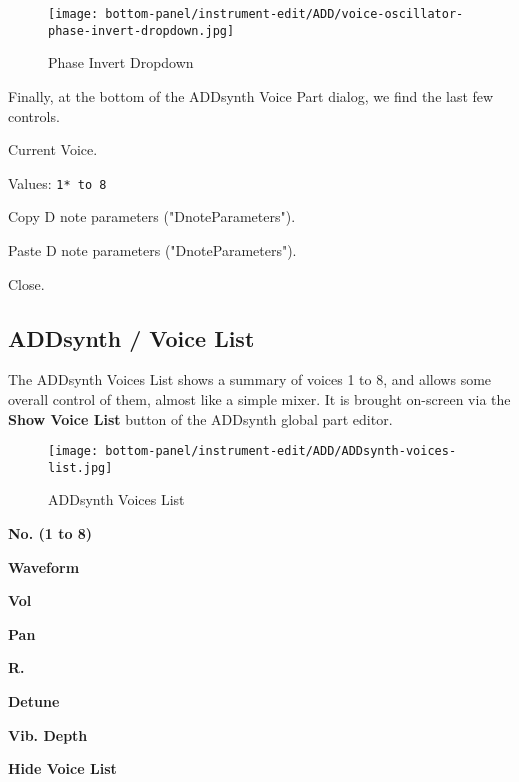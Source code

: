 \begin{figure}[H]
   \centering 
   \texttt{[image: bottom-panel/instrument-edit/ADD/voice-oscillator-phase-invert-dropdown.jpg]}
   \caption{Phase Invert Dropdown}
   \label{fig:phase_invert_dropdown}
\end{figure}

   Finally, at the bottom of the ADDsynth Voice Part dialog, we find the
   last few controls.

   \setcounter{ItemCounter}{0}      %

   Current Voice.

   Values: \texttt{1* to 8}

   Copy D note parameters ("DnoteParameters").

   Paste D note parameters ("DnoteParameters").

   Close.

\subsection{ADDsynth / Voice List}
\label{subsec:addsynth_voice_list}

   The ADDsynth Voices List shows a summary of voices 1 to 8, and allows
   some overall control of them, almost like a simple mixer.
   It is brought on-screen via the \textbf{Show Voice List} button
   of the ADDsynth global part editor.

\begin{figure}[H]
   \centering 
   \texttt{[image: bottom-panel/instrument-edit/ADD/ADDsynth-voices-list.jpg]}
   \caption{ADDsynth Voices List}
   \label{fig:addsynth_voices_list}
\end{figure}

   \begin{enumber}
      \item \textbf{No. (1 to 8)}
      \item \textbf{Waveform}
      \item \textbf{Vol}
      \item \textbf{Pan}
      \item \textbf{R.}
      \item \textbf{Detune}
      \item \textbf{Vib. Depth}
      \item \textbf{Hide Voice List}
   \end{enumber}

